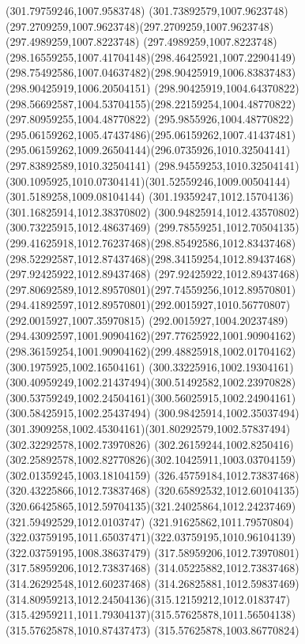 {{\lineto(301.79759246,1007.9583748)
\curveto(301.73892579,1007.9623748)(297.2709259,1007.9623748)(297.2709259,1007.9623748)
\lineto(297.4989259,1007.8223748)
\curveto(297.4989259,1007.8223748)(298.16559255,1007.41704148)(298.46425921,1007.22904149)
\curveto(298.75492586,1007.04637482)(298.90425919,1006.83837483)(298.90425919,1006.20504151)
\lineto(298.90425919,1004.64370822)
\curveto(298.56692587,1004.53704155)(298.22159254,1004.48770822)(297.80959255,1004.48770822)
\curveto(295.9855926,1004.48770822)(295.06159262,1005.47437486)(295.06159262,1007.41437481)
\curveto(295.06159262,1009.26504144)(296.0735926,1010.32504141)(297.83892589,1010.32504141)
\curveto(298.94559253,1010.32504141)(300.1095925,1010.07304141)(301.52559246,1009.00504144)
\lineto(301.5189258,1009.08104144)
\lineto(301.19359247,1012.15704136)
\lineto(301.16825914,1012.38370802)
\lineto(300.94825914,1012.43570802)
\lineto(300.73225915,1012.48637469)
\curveto(299.78559251,1012.70504135)(299.41625918,1012.76237468)(298.85492586,1012.83437468)
\curveto(298.52292587,1012.87437468)(298.34159254,1012.89437468)(297.92425922,1012.89437468)
\curveto(297.92425922,1012.89437468)(297.80692589,1012.89570801)(297.74559256,1012.89570801)
\curveto(294.41892597,1012.89570801)(292.0015927,1010.56770807)(292.0015927,1007.35970815)
\curveto(292.0015927,1004.20237489)(294.43092597,1001.90904162)(297.77625922,1001.90904162)
\curveto(298.36159254,1001.90904162)(299.48825918,1002.01704162)(300.1975925,1002.16504161)
\curveto(300.33225916,1002.19304161)(300.40959249,1002.21437494)(300.51492582,1002.23970828)
\curveto(300.53759249,1002.24504161)(300.56025915,1002.24904161)(300.58425915,1002.25437494)
\curveto(300.98425914,1002.35037494)(301.3909258,1002.45304161)(301.80292579,1002.57837494)
\lineto(302.32292578,1002.73970826)
\lineto(302.26159244,1002.8250416)
\curveto(302.25892578,1002.82770826)(302.10425911,1003.03704159)(302.01359245,1003.18104159)
\moveto(326.45759184,1012.73837468)
\lineto(320.43225866,1012.73837468)
\lineto(320.65892532,1012.60104135)
\curveto(320.66425865,1012.59704135)(321.24025864,1012.24237469)(321.59492529,1012.0103747)
\curveto(321.91625862,1011.79570804)(322.03759195,1011.65037471)(322.03759195,1010.96104139)
\lineto(322.03759195,1008.38637479)
\lineto(317.58959206,1012.73970801)
\lineto(317.58959206,1012.73837468)
\lineto(314.05225882,1012.73837468)
\lineto(314.26292548,1012.60237468)
\curveto(314.26825881,1012.59837469)(314.80959213,1012.24504136)(315.12159212,1012.0183747)
\curveto(315.42959211,1011.79304137)(315.57625878,1011.56504138)(315.57625878,1010.87437473)
\lineto(315.57625878,1003.86770824)
}}
